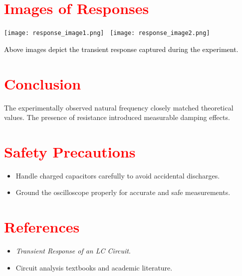 \documentclass[a4paper,12pt]{article}
\begin{document}
\section{\textcolor{red}{Images of Responses}}
\begin{tcolorbox}[colframe=black!70!black,colback=gray!10!white,title=\textbf{\textcolor{white}{Oscilloscope Waveforms and Circuit Images}}]
\begin{center}
\texttt{[image: response\_image1.png]} \
\texttt{[image: response\_image2.png]}
\end{center}
\textcolor{black}{Above images depict the transient response captured during the experiment.}
\end{tcolorbox}

\section{\textcolor{red}{Conclusion}}
\begin{tcolorbox}[colframe=red!70!black,colback=yellow!10!white]
The experimentally observed natural frequency closely matched theoretical values. The presence of resistance introduced measurable damping effects.
\end{tcolorbox}

\section{\textcolor{red}{Safety Precautions}}
\begin{tcolorbox}[colframe=purple!70!black,colback=magenta!10!white]
\begin{itemize}
    \item Handle charged capacitors carefully to avoid accidental discharges.
    \item Ground the oscilloscope properly for accurate and safe measurements.
\end{itemize}
\end{tcolorbox}

\section{\textcolor{red}{References}}
\begin{tcolorbox}[colframe=green!70!black,colback=yellow!10!white]
\begin{itemize}
    \item \textit{Transient Response of an LC Circuit}.
    \item Circuit analysis textbooks and academic literature.
\end{itemize}
\end{tcolorbox}
\end{document}
